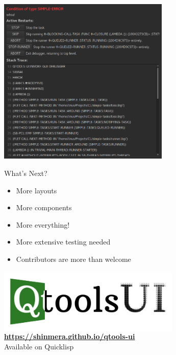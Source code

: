 \documentclass[14pt]{beamer}
\newcommand{\toptitle}[1]{
  {\huge #1} \\
  \vspace{0.2cm}
}
\begin{document}
\begin{frame}
  \begin{center}\includegraphics[height=8cm]{debugger.png}\end{center}
\end{frame}

\begin{frame}
  \toptitle{What's Next?}
  \begin{itemize}
  \item More layouts
  \item More components
    \pause
  \item More everything!
    \pause
  \item More extensive testing needed
  \item Contributors are more than welcome
  \end{itemize}
\end{frame}

\begin{frame}
  \begin{center}
    \colorbox{white}{\includegraphics[height=3cm]{qtools-ui-logo.png}} \\
    {\small\bfseries \url{https://shinmera.github.io/qtools-ui}} \\
    \vspace{0.3cm}
    {\Large Available on Quicklisp}
  \end{center}
\end{frame}
\end{document}
